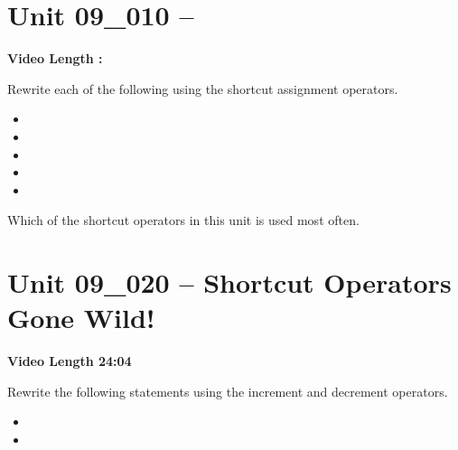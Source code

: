 \documentclass[letterpaper,12pt]{exam}
\newcommand{\unit}{Unit 09}
\begin{document}
\section*{\unit\_010 -- } %
\par{\selectfont\textbf{Video Length :}}


\begin{questions}
\begin{samepage}
    \question Rewrite each of the following using the shortcut assignment operators.
      \begin{itemize}
        \item {}
        \vspace{5mm}
        \item {}
        \vspace{5mm}
        \item {}
        \vspace{5mm}
        \item {}
        \vspace{5mm}
        \item {}
        \vspace{5mm}
       \end{itemize}
\end{samepage}

\begin{samepage}
    \question Which of the shortcut operators in this unit is used most often.
    \vspace{5mm}
\end{samepage}


\section*{\unit\_020 -- Shortcut Operators Gone Wild!} %
\par{\selectfont\textbf{Video Length 24:04}}

\begin{samepage}
    \question Rewrite the following statements using the increment and decrement operators.
      \begin{itemize}
        \item {}
        \vspace{5mm}
        \item {}
        \vspace{5mm}
       \end{itemize}
\end{samepage}


\end{questions}
\end{document}
